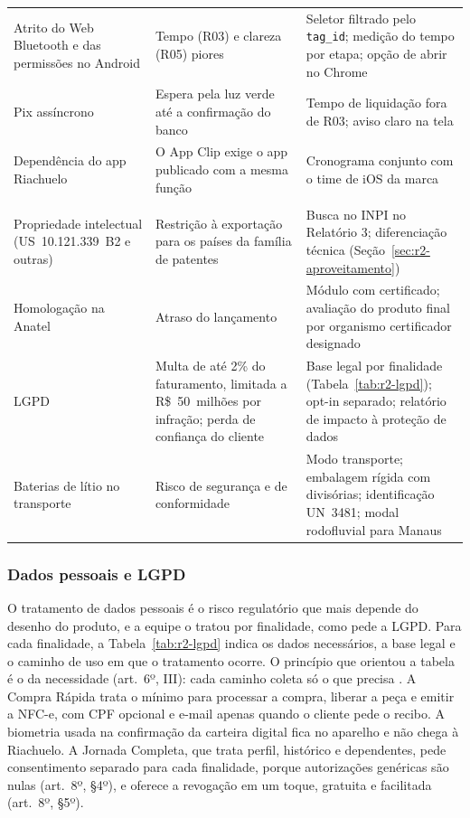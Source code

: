 \begin{longtable}{@{}
    >{\RaggedRight\arraybackslash}p{3.6cm}
    >{\RaggedRight\arraybackslash}p{4.8cm}
    >{\RaggedRight\arraybackslash}p{6.9cm}@{}}
Atrito do Web Bluetooth e das permissões no Android & Tempo (R03) e clareza (R05) piores & Seletor filtrado pelo \texttt{tag\_id}; medição do tempo por etapa; opção de abrir no Chrome \\
Pix assíncrono & Espera pela luz verde até a confirmação do banco & Tempo de liquidação fora de R03; aviso claro na tela \\
Dependência do app Riachuelo & O App Clip exige o app publicado com a mesma função & Cronograma conjunto com o time de iOS da marca \\
\multicolumn{3}{@{}l}{\cellcolor{r2cinzaclaro}Regulatórios e jurídicos} \\
Propriedade intelectual (US~10.121.339~B2 e outras) & Restrição à exportação para os países da família de patentes & Busca no INPI no Relatório 3; diferenciação técnica (Seção~\ref{sec:r2-aproveitamento}) \\
Homologação na Anatel & Atraso do lançamento & Módulo com certificado; avaliação do produto final por organismo certificador designado \\
LGPD & Multa de até 2\% do faturamento, limitada a R\$~50~milhões por infração; perda de confiança do cliente & Base legal por finalidade (Tabela~\ref{tab:r2-lgpd}); opt-in separado; relatório de impacto à proteção de dados \\
Baterias de lítio no transporte & Risco de segurança e de conformidade & Modo transporte; embalagem rígida com divisórias; identificação UN~3481; modal rodofluvial para Manaus \\
\end{longtable}
\endgroup

\subsubsection{Dados pessoais e LGPD}
\label{sub:r2-lgpd}

O tratamento de dados pessoais é o risco regulatório que mais depende do desenho do produto, e a equipe o tratou por finalidade, como pede a LGPD. Para cada finalidade, a Tabela~\ref{tab:r2-lgpd} indica os dados necessários, a base legal e o caminho de uso em que o tratamento ocorre. O princípio que orientou a tabela é o da necessidade (art.~6º, III): cada caminho coleta só o que precisa \cite{brasil2018lgpd}. A Compra Rápida trata o mínimo para processar a compra, liberar a peça e emitir a NFC-e, com CPF opcional e e-mail apenas quando o cliente pede o recibo. A biometria usada na confirmação da carteira digital fica no aparelho e não chega à Riachuelo. A Jornada Completa, que trata perfil, histórico e dependentes, pede consentimento separado para cada finalidade, porque autorizações genéricas são nulas (art.~8º, §4º), e oferece a revogação em um toque, gratuita e facilitada (art.~8º, §5º).

